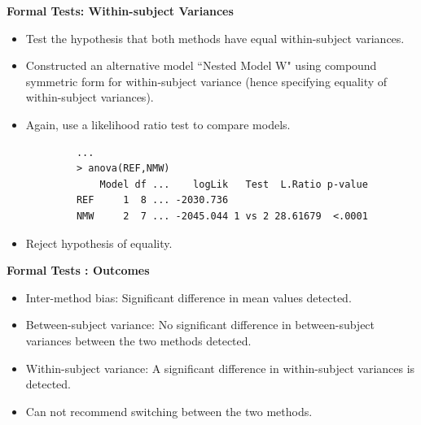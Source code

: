 \documentclass[compress]{beamer}        %
\makeatletter
\newcommand{\tcb}{\textcolor{beamer@blendedblue}}
\makeatother
\begin{document}
		\begin{frame}[fragile]{\bf \tcb{Formal Tests: Within-subject Variances}}
			\begin{itemize}
				\item Test the hypothesis that both methods have equal within-subject variances.
				\item Constructed an alternative model ``Nested Model W" using compound symmetric form for within-subject variance (hence specifying equality of within-subject variances).
				\item Again, use a likelihood ratio test to compare models.
			\end{itemize}
			\begin{verbatim}
			...
			> anova(REF,NMW)
			    Model df ...    logLik   Test  L.Ratio p-value
			REF     1  8 ... -2030.736
			NMW     2  7 ... -2045.044 1 vs 2 28.61679  <.0001
			\end{verbatim}
			\begin{itemize}
				\item Reject hypothesis of equality.
			\end{itemize}
		\end{frame}
		\begin{frame}[fragile]{\bf \tcb{Formal Tests : Outcomes}}
			\large 
			\begin{itemize}
				\item Inter-method bias: Significant difference in mean values detected.\\
				\vspace{0.25cm}\item Between-subject variance: No significant difference in between-subject variances between the two methods detected.\\
				\vspace{0.25cm}\item Within-subject variance: A significant difference in within-subject variances is detected.\\
				\vspace{0.25cm}\item Can not recommend switching between the two methods.
			\end{itemize}
		\end{frame}
\end{document}
